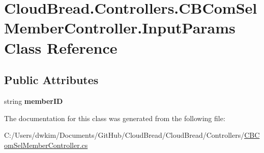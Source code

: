 \hypertarget{a00095}{}\section{Cloud\+Bread.\+Controllers.\+C\+B\+Com\+Sel\+Member\+Controller.\+Input\+Params Class Reference}
\label{a00095}
\subsection*{Public Attributes}
\begin{DoxyCompactItemize}
\item 
string {\bfseries member\+ID}\hypertarget{a00095_ad75a94e40a6bda7b1177c7a30560a79e}{}\label{a00095_ad75a94e40a6bda7b1177c7a30560a79e}

\end{DoxyCompactItemize}


The documentation for this class was generated from the following file\+:\begin{DoxyCompactItemize}
\item 
C\+:/\+Users/dwkim/\+Documents/\+Git\+Hub/\+Cloud\+Bread/\+Cloud\+Bread/\+Controllers/\hyperlink{a00202}{C\+B\+Com\+Sel\+Member\+Controller.\+cs}\end{DoxyCompactItemize}
